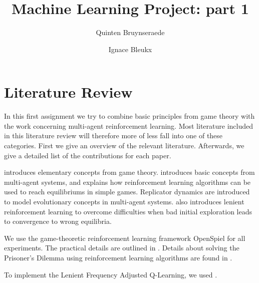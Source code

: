 \documentclass[10pt,a4paper]{article}
\author{Quinten Bruynseraede}
\author{Ignace Bleukx}
\title{Machine Learning Project: part 1}
\begin{document}
\maketitle

\section{Literature Review}
In this first assignment we try to combine basic principles from game theory with the work concerning multi-agent reinforcement learning. Most literature included in this literature review will therefore more of less fall into one of these categories. First we give an overview of the relevant literature. Afterwards, we give a detailed list of the contributions for each paper.

\citet{mas} introduces elementary concepts from game theory. \citet{phdthesis} introduces basic concepts from multi-agent systems, and explains how reinforcement learning algorithms can be used to reach equilibriums in simple games. Replicator dynamics are introduced to model evolutionary concepts in multi-agent systems. \citet{phdthesis} also introduces lenient reinforcement learning to overcome difficulties when bad initial exploration leads to convergence to wrong equilibria.

We use the game-theoretic reinforcement learning framework OpenSpiel for all experiments. The practical details are outlined in \citet{lanctot2019openspiel}. Details about solving the Prisoner's Dilemma using reinforcement learning algorithms are found in \citet{rlforpd}.

To implement the Lenient Frequency Adjusted Q-Learning, we used \citet{evoldynamics}.
\end{document}
